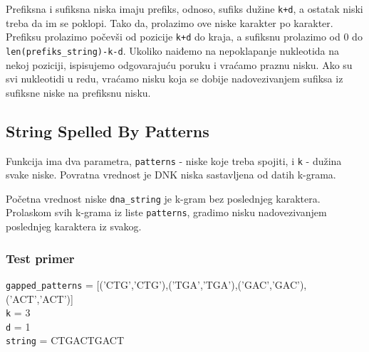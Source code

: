 Prefiksna i sufiksna niska imaju prefiks, odnoso, sufiks dužine \texttt{k+d}, a ostatak niski treba da im se poklopi. Tako da, prolazimo ove niske karakter po karakter. Prefiksu prolazimo počevši od pozicije \texttt{k+d} do kraja, a sufiksnu prolazimo od 0 do \texttt{len(prefiks\_string)-k-d}. Ukoliko naiđemo na nepoklapanje nukleotida na nekoj poziciji, ispisujemo odgovarajuću poruku i vraćamo praznu nisku. Ako su svi nukleotidi u redu, vraćamo nisku koja se dobije nadovezivanjem sufiksa iz sufiksne niske na prefiksnu nisku.





\subsection{String Spelled By Patterns}
\label{stringSpelledByPatterns}

Funkcija ima dva parametra, \texttt{patterns} - niske koje treba spojiti, i \texttt{k} - dužina svake niske. Povratna vrednost je DNK niska sastavljena od datih k-grama.

Početna vrednost niske \texttt{dna\_string} je k-gram bez poslednjeg karaktera. Prolaskom svih k-grama iz liste \texttt{patterns}, gradimo nisku nadovezivanjem poslednjeg karaktera iz svakog.




\subsubsection{Test primer}

\noindent\texttt{gapped\_patterns} = [('CTG','CTG'),('TGA','TGA'),('GAC','GAC'),('ACT','ACT')]
\\\texttt{k} = 3
\\\texttt{d} = 1
\\\texttt{string} = CTGACTGACT

